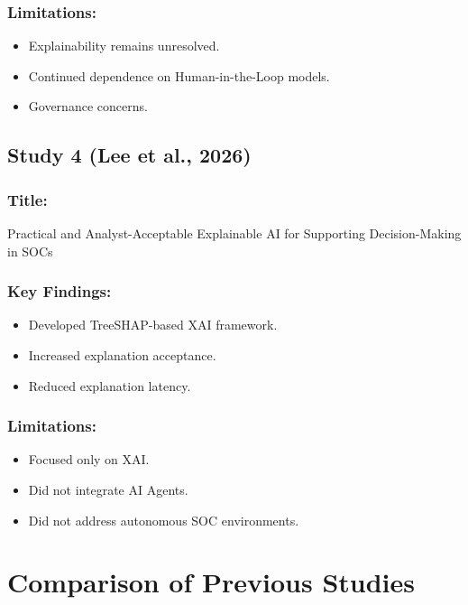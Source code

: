 \documentclass[12pt,a4paper]{report}
\begin{document}
\subsubsection*{Limitations:}
\begin{itemize}
    \item Explainability remains unresolved.
    \item Continued dependence on Human-in-the-Loop models.
    \item Governance concerns.
\end{itemize}

\subsection{Study 4 (Lee et al., 2026)}

\subsubsection*{Title:}
Practical and Analyst-Acceptable Explainable AI for Supporting Decision-Making in SOCs

\subsubsection*{Key Findings:}
\begin{itemize}
    \item Developed TreeSHAP-based XAI framework.
    \item Increased explanation acceptance.
    \item Reduced explanation latency.
\end{itemize}

\subsubsection*{Limitations:}
\begin{itemize}
    \item Focused only on XAI.
    \item Did not integrate AI Agents.
    \item Did not address autonomous SOC environments.
\end{itemize}

\section{Comparison of Previous Studies}
\label{sec:comparison}
\end{document}
